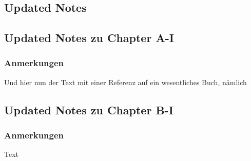 \begin{partbacktext}
\part{Updated Notes}
\end{partbacktext}
\setcounter{chapter}{0}
\chapter*{Updated Notes zu Chapter A-I}
\section*{Anmerkungen}
Und hier nun der Text mit einer Referenz auf ein wesentliches Buch, nämlich 
\citet{engelnagel:2006}
\chapter*{Updated Notes zu Chapter B-I}
\section*{Anmerkungen}
Text 
\RaggedRight

